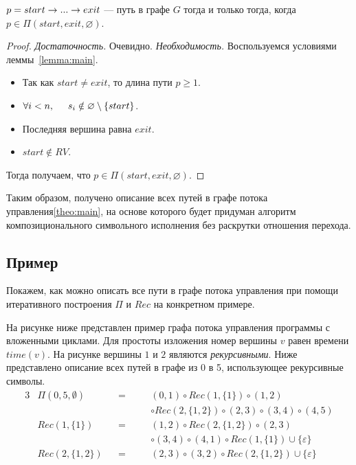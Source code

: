 \begin{defn}
\begin{thrm}
\label{theo:main}
$p = start \rightarrow ... \rightarrow exit$ --- путь в графе $G$ тогда и только тогда, когда $p \in \Pi(start,exit,\varnothing)$. 
\end{thrm}

\begin{proof}
\emph{Достаточность.} Очевидно.
\emph{Необходимость.}
Воспользуемся условиями леммы~\ref{lemma:main}.
\begin{itemize}
    \item Так как $start \neq exit$, то длина пути $p \geq 1$.
    \item $\forall i < n, \hspace{5mm} s_i \notin \varnothing \setminus \{start\}$.
    \item Последняя вершина равна $exit$.
    \item $start \notin RV$.
\end{itemize}
Тогда получаем, что $p \in \Pi(start,exit,\varnothing)$.
\end{proof}

Таким образом, получено описание всех путей в графе потока управления\ref{theo:main}, на основе которого будет придуман алгоритм композиционального символьного исполнения без раскрутки отношения перехода.


\subsection{Пример}
Покажем, как можно описать все пути в графе потока управления при помощи итеративного построения $\Pi$ и $Rec$ на конкретном примере.

На рисунке ниже представлен пример графа потока управления программы с вложенными циклами. Для простоты изложения номер вершины $v$ равен времени $time(v)$. На рисунке вершины $1$ и $2$ являются \emph{рекурсивными}. Ниже представлено описание всех путей в графе из 0 в 5, использующее рекурсивные символы.
%
\begin{alignat*}{3}
&\Pi(0, 5, \emptyset) &&= \quad &&(0,1) \circ Rec(1,\{1\}) \circ (1,2) \\
&       \quad         &&  \quad &&\circ Rec(2,\{1,2\}) \circ (2,3) \circ (3,4) \circ (4,5) \\
&Rec(1,\{1\})         &&= \quad &&(1,2) \circ Rec(2,\{1,2\}) \circ (2,3) \\ 
&       \quad         &&  \quad &&\circ (3,4) \circ (4,1) \circ Rec(1,\{1\}) \cup \{\varepsilon\} \\
&Rec(2,\{1,2\})       &&= \quad &&(2,3) \circ (3,2) \circ Rec(2,\{1,2\}) \cup \{\varepsilon\}
\end{alignat*}


\end{defn}
